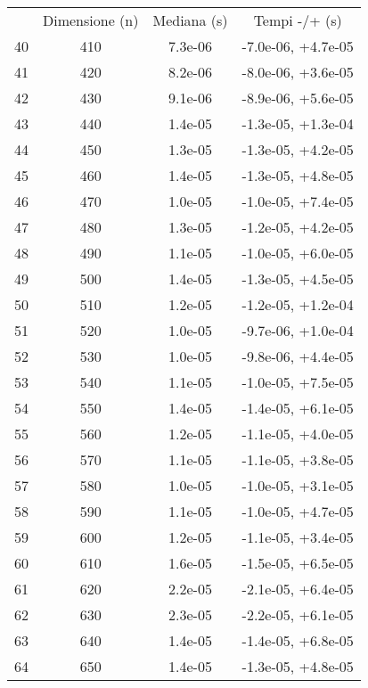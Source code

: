 \begin{table}
\centering
\begin{adjustbox}{width=1\textwidth/2}
\begin{tabular}{|c|c|c|c|}
\hline
 & Dimensione (n) & Mediana (s) & Tempi -/+ (s) \\
40 & 410 & 7.3e-06 & -7.0e-06, +4.7e-05 \\
\cline{1-4}
41 & 420 & 8.2e-06 & -8.0e-06, +3.6e-05 \\
\cline{1-4}
42 & 430 & 9.1e-06 & -8.9e-06, +5.6e-05 \\
\cline{1-4}
43 & 440 & 1.4e-05 & -1.3e-05, +1.3e-04 \\
\cline{1-4}
44 & 450 & 1.3e-05 & -1.3e-05, +4.2e-05 \\
\cline{1-4}
45 & 460 & 1.4e-05 & -1.3e-05, +4.8e-05 \\
\cline{1-4}
46 & 470 & 1.0e-05 & -1.0e-05, +7.4e-05 \\
\cline{1-4}
47 & 480 & 1.3e-05 & -1.2e-05, +4.2e-05 \\
\cline{1-4}
48 & 490 & 1.1e-05 & -1.0e-05, +6.0e-05 \\
\cline{1-4}
49 & 500 & 1.4e-05 & -1.3e-05, +4.5e-05 \\
\cline{1-4}
50 & 510 & 1.2e-05 & -1.2e-05, +1.2e-04 \\
\cline{1-4}
51 & 520 & 1.0e-05 & -9.7e-06, +1.0e-04 \\
\cline{1-4}
52 & 530 & 1.0e-05 & -9.8e-06, +4.4e-05 \\
\cline{1-4}
53 & 540 & 1.1e-05 & -1.0e-05, +7.5e-05 \\
\cline{1-4}
54 & 550 & 1.4e-05 & -1.4e-05, +6.1e-05 \\
\cline{1-4}
55 & 560 & 1.2e-05 & -1.1e-05, +4.0e-05 \\
\cline{1-4}
56 & 570 & 1.1e-05 & -1.1e-05, +3.8e-05 \\
\cline{1-4}
57 & 580 & 1.0e-05 & -1.0e-05, +3.1e-05 \\
\cline{1-4}
58 & 590 & 1.1e-05 & -1.0e-05, +4.7e-05 \\
\cline{1-4}
59 & 600 & 1.2e-05 & -1.1e-05, +3.4e-05 \\
\cline{1-4}
60 & 610 & 1.6e-05 & -1.5e-05, +6.5e-05 \\
\cline{1-4}
61 & 620 & 2.2e-05 & -2.1e-05, +6.4e-05 \\
\cline{1-4}
62 & 630 & 2.3e-05 & -2.2e-05, +6.1e-05 \\
\cline{1-4}
63 & 640 & 1.4e-05 & -1.4e-05, +6.8e-05 \\
\cline{1-4}
64 & 650 & 1.4e-05 & -1.3e-05, +4.8e-05 \\

\end{tabular}
\end{adjustbox}
\end{table}
